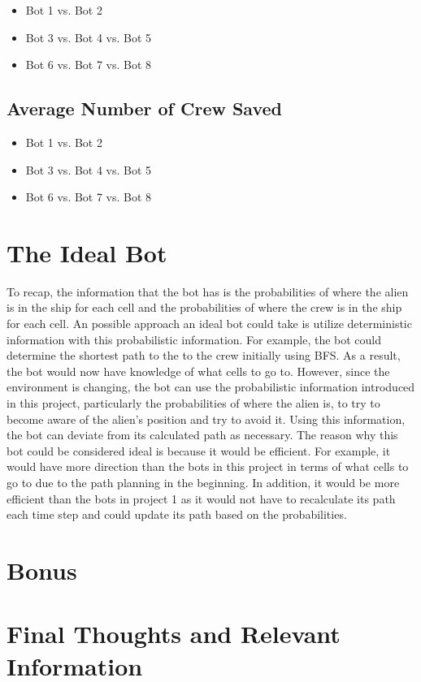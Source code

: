 \documentclass[11pt]{article}
\begin{document}
\begin{itemize}
    \item Bot 1 vs. Bot 2
    \item Bot 3 vs. Bot 4 vs. Bot 5
    \item Bot 6 vs. Bot 7 vs. Bot 8
\end{itemize}

\subsection{Average Number of Crew Saved}

\begin{itemize}
    \item Bot 1 vs. Bot 2
    \item Bot 3 vs. Bot 4 vs. Bot 5
    \item Bot 6 vs. Bot 7 vs. Bot 8
\end{itemize}


\section{The Ideal Bot}

To recap, the information that the bot has is the probabilities of where the alien is in the ship for each cell and the probabilities of where the crew is in the ship for each cell. An possible approach an ideal bot could take is utilize deterministic information with this probabilistic information. For example, the bot could determine the shortest path to the to the crew initially using BFS. As a result, the bot would now have knowledge of what cells to go to. However, since the environment is changing, the bot can use the probabilistic information introduced in this project, particularly the probabilities of where the alien is, to try to become aware of the alien's position and try to avoid it. Using this information, the bot can deviate from its calculated path as necessary. The reason why this bot could be considered ideal is because it would be efficient. For example, it would have more direction than the bots in this project in terms of what cells to go to due to the path planning in the beginning. In addition, it would be more efficient than the bots in project 1 as it would not have to recalculate its path each time step and could update its path based on the probabilities. 

\section{Bonus}



\section{Final Thoughts and Relevant Information}
\end{document}
